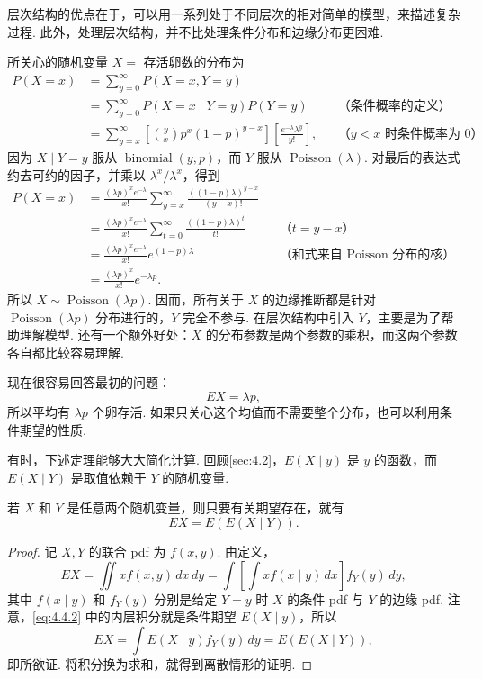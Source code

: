 层次结构的优点在于，可以用一系列处于不同层次的相对简单的模型，来描述复杂过程. 此外，处理层次结构，并不比处理条件分布和边缘分布更困难.
\begin{example}[续\autoref{ex:4.4.1}]\label{ex:4.4.2}
所关心的随机变量 $X=$ 存活卵数的分布为
$$
\begin{aligned}
P(X=x)&=\sum_{y=0}^{\infty}P(X=x,Y=y)\\
&=\sum_{y=0}^{\infty}P(X=x\mid Y=y)P(Y=y)&&\text{（条件概率的定义）}\\
&=\sum_{y=x}^{\infty}\left[\binom yx p^x(1-p)^{y-x}\right]\left[\frac{e^{-\lambda}\lambda^y}{y!}\right],&&\text{（$y<x$ 时条件概率为 0）}
\end{aligned}
$$
因为 $X\mid Y=y$ 服从 $\operatorname{binomial}(y,p)$，而 $Y$ 服从 $\operatorname{Poisson}(\lambda)$. 对最后的表达式约去可约的因子，并乘以 $\lambda^x/\lambda^x$，得到
$$
\begin{aligned}
P(X=x)&=\frac{(\lambda p)^xe^{-\lambda}}{x!}\sum_{y=x}^{\infty}\frac{((1-p)\lambda)^{y-x}}{(y-x)!}\\
&=\frac{(\lambda p)^xe^{-\lambda}}{x!}\sum_{t=0}^{\infty}\frac{((1-p)\lambda)^t}{t!}&&\text{（$t=y-x$）}\\
&=\frac{(\lambda p)^xe^{-\lambda}}{x!}e^{(1-p)\lambda}&&\text{（和式来自 Poisson 分布的核）}\\
&=\frac{(\lambda p)^x}{x!}e^{-\lambda p}.
\end{aligned}
$$
所以 $X\sim\operatorname{Poisson}(\lambda p)$. 因而，所有关于 $X$ 的边缘推断都是针对 $\operatorname{Poisson}(\lambda p)$ 分布进行的，$Y$ 完全不参与. 在层次结构中引入 $Y$，主要是为了帮助理解模型. 还有一个额外好处：$X$ 的分布参数是两个参数的乘积，而这两个参数各自都比较容易理解.

现在很容易回答最初的问题：
$$EX=\lambda p,$$
所以平均有 $\lambda p$ 个卵存活. 如果只关心这个均值而不需要整个分布，也可以利用条件期望的性质.
\end{example}
有时，下述定理能够大大简化计算. 回顾\autoref{sec:4.2}，$E(X\mid y)$ 是 $y$ 的函数，而 $E(X\mid Y)$ 是取值依赖于 $Y$ 的随机变量.
\begin{theorem}\label{thm:4.4.3}
若 $X$ 和 $Y$ 是任意两个随机变量，则只要有关期望存在，就有
\begin{equation}\label{eq:4.4.1}
EX=E(E(X\mid Y)).
\end{equation}
\end{theorem}
\begin{proof}
记 $X,Y$ 的联合 pdf 为 $f(x,y)$. 由定义，
\begin{equation}\label{eq:4.4.2}
EX=\iint xf(x,y)\,dx\,dy=\int\left[\int xf(x\mid y)\,dx\right]f_Y(y)\,dy,
\end{equation}
其中 $f(x\mid y)$ 和 $f_Y(y)$ 分别是给定 $Y=y$ 时 $X$ 的条件 pdf 与 $Y$ 的边缘 pdf. 注意，\eqref{eq:4.4.2} 中的内层积分就是条件期望 $E(X\mid y)$，所以
$$EX=\int E(X\mid y)f_Y(y)\,dy=E(E(X\mid Y)),$$
即所欲证. 将积分换为求和，就得到离散情形的证明.
\end{proof}

